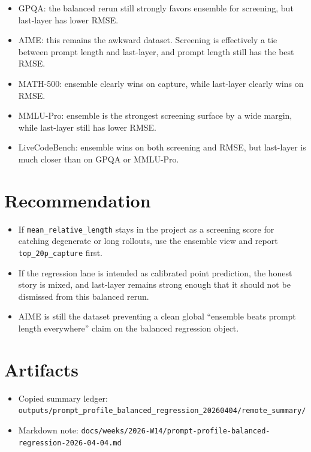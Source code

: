 \documentclass[11pt]{article}
\begin{document}
\begin{itemize}
\item GPQA: the balanced rerun still strongly favors ensemble for screening, but last-layer has lower RMSE.
\item AIME: this remains the awkward dataset. Screening is effectively a tie between prompt length and last-layer, and prompt length still has the best RMSE.
\item MATH-500: ensemble clearly wins on capture, while last-layer clearly wins on RMSE.
\item MMLU-Pro: ensemble is the strongest screening surface by a wide margin, while last-layer still has lower RMSE.
\item LiveCodeBench: ensemble wins on both screening and RMSE, but last-layer is much closer than on GPQA or MMLU-Pro.
\end{itemize}

\section{Recommendation}

\begin{itemize}
\item If \texttt{mean\_relative\_length} stays in the project as a screening score for catching degenerate or long rollouts, use the ensemble view and report \texttt{top\_20p\_capture} first.
\item If the regression lane is intended as calibrated point prediction, the honest story is mixed, and last-layer remains strong enough that it should not be dismissed from this balanced rerun.
\item AIME is still the dataset preventing a clean global ``ensemble beats prompt length everywhere'' claim on the balanced regression object.
\end{itemize}

\section{Artifacts}

\begin{itemize}
\item Copied summary ledger: \texttt{outputs/prompt\_profile\_balanced\_regression\_20260404/remote\_summary/}
\item Markdown note: \texttt{docs/weeks/2026-W14/prompt-profile-balanced-regression-2026-04-04.md}
\end{itemize}
\end{document}
